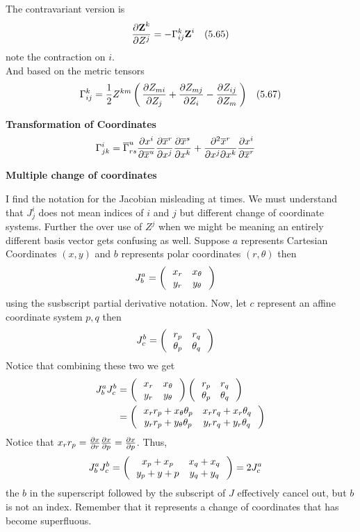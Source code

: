 \documentclass[12pt,a4paper]{report}
\newcommand{\COFF}[3]{\Gamma^{#1}_{{#2}{#3}}}
\newcommand{\VK}[1]{\textbf{#1}}
\begin{document}
\begin{description}
	The contravariant version is 
	\begin{align*}
		\PART{\VK{Z}^k}{Z^j} &= -\COFF{k}{i}{j}\VK{Z}^i & (5.65)
	\end{align*}note the contraction on $i$.\\
	
	And based on the metric tensors
	\begin{align*}
		\COFF{k}{i}{j} &= \frac{1}{2}Z^{km}\PAREN{\PART{Z_{mi}}{Z_j}+\PART{Z_{mj}}{Z_i}-\PART{Z_{ij}}{Z_m}} & (5.67)
	\end{align*}
	
	\textbf{Transformation of Coordinates}
	\begin{align*}
		\COFF{i}{j}{k} &= \CONJ{\Gamma}^u_{rs} \PART{x^i}{\CONJ{x}^u}\PART{\CONJ{x}^r}{x^j}\PART{\CONJ{x}^s}{x^k}+\frac{\partial^2\CONJ{x}^r}{\partial x^j\partial x^k}\PART{x^i}{\CONJ{x}^r}
	\end{align*}
	
	\item \textbf{Multiple change of coordinates}
	
	I find the notation for the Jacobian misleading at times.  We must understand that $J^i_j$ does not mean indices of $i$ and $j$ but different change of coordinate systems.  Further the over use of $Z^j$ when we might be meaning an entirely different basis vector gets confusing as well.  Suppose $a$ represents Cartesian Coordinates $(x,y)$ and $b$ represents polar coordinates $(r, \theta)$ then
	\begin{align*}
		J^a_b &= \left (\,  \begin{array}{c c} x_r&x_\theta \\ y_r & y_\theta \end{array}  \,\right )
	\end{align*}using the susbscript partial derivative notation.  Now, let $c$ represent an affine coordinate system $p,q$  then 
	\begin{align*}
		J^b_c &= \left (\,  \begin{array}{c c} r_p&r_q \\ \theta_p & \theta_q \end{array}  \,\right ) 
	\end{align*}Notice that combining these two we get
	\begin{align*}
		J^a_bJ^b_c &= \left (\,  \begin{array}{c c} x_r&x_\theta \\ y_r & y_\theta \end{array}  \,\right )\left (\,  \begin{array}{c c} r_p&r_q \\ \theta_p & \theta_q \end{array}  \,\right ) \\
		&= \left (\,  \begin{array}{c c} x_rr_p+x_\theta\theta_p&x_rr_q+x_r\theta_q \\ y_rr_p+y_\theta\theta_p & y_rr_q+y_r\theta_q \end{array}  \,\right )
	\end{align*}Notice that $x_rr_p = \frac{\partial x}{\partial r}\frac{\partial x}{\partial p}= \frac{\partial x}{\partial p}$.  Thus,
	\begin{align*}
	J^a_bJ^b_c &= \left (\,  \begin{array}{c c} x_p+x_p&x_q+x_q \\ y_p+y+p & y_q+y_q \end{array}  \,\right ) = 2J^a_c
	\end{align*}the $b$ in the superscript followed by the subscript of $J$ effectively cancel out, but $b$ is not an index.  Remember that it represents a change of coordinates that has become superfluous.
	

\end{description}
\end{document}
